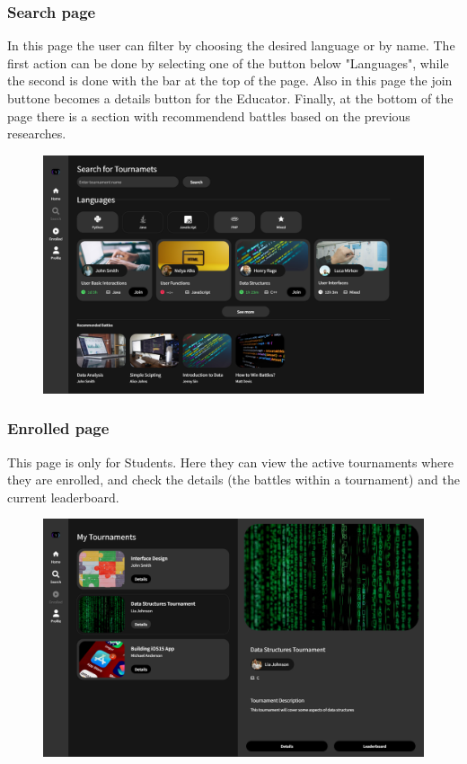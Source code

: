 \documentclass[12pt, a4paper]{report}
\begin{document}
        \subsubsection{Search page} 
        In this page the user can filter by choosing the desired language or by name. 
        The first action can be done by selecting one of the button below "Languages", while the second is done with the bar at the top of the page. 
        Also in this page the join buttone becomes a details button for the Educator. 
        Finally, at the bottom of the page there is a section with recommendend battles based on the previous researches.
        \begin{figure}[H]
            \centering
            \includegraphics[width=0.8\linewidth]{images/search.png}
        \end{figure}

        \subsubsection{Enrolled page} 
        This page is only for Students. 
        Here they can view the active tournaments where they are enrolled, and check the details (the battles within a tournament) and the current leaderboard.
        \begin{figure}[H]
            \centering
            \includegraphics[width=0.8\linewidth]{images/enrolled.png}
        \end{figure}
\end{document}
